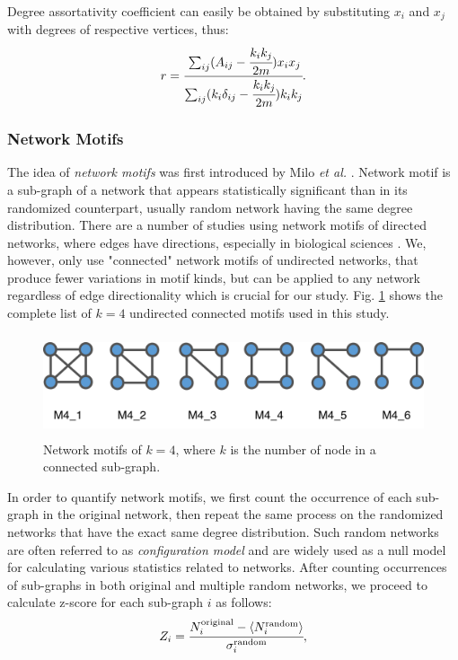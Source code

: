 \documentclass{article}
\begin{document}
Degree assortativity coefficient can easily be obtained by substituting $x_i$ and $x_j$ with degrees of respective vertices, thus:
	\begin{equation}
	 r =  \cfrac{\sum_{ij}(A_{ij} - \cfrac{k_i k_j}{2m})x_i x_j}{\sum_{ij}(k_i \delta_{ij} - \cfrac{k_i k_j}{2m}) k_i k_j}.
	\end{equation}

	\subsubsection{Network Motifs} 
The idea of \textit{network motifs} was first introduced by Milo \textit{et al.} \cite{Milo_motif}. Network motif is a sub-graph of a network that appears statistically significant than in its randomized counterpart, usually random network having the same degree distribution. There are a number of studies using network motifs of directed networks, where edges have directions, especially in biological sciences \cite{Alon2007, MotifsInBrain}. We, however, only use "connected" network motifs of undirected networks, that produce fewer variations in motif kinds, but can be applied to any network regardless of edge directionality which is crucial for our study. Fig. \ref{motifs} shows the complete list of $k=4$ undirected connected motifs used in this study.

\begin{figure}[ht]
	\begin{center}
		\vspace{0.5cm}
		\includegraphics[clip,width=12cm,height = 3cm]{motifs.png}
		\vspace{0.5cm}
		\caption{Network motifs of $k =4$, where $k$ is the number of node in a connected sub-graph.}
		\label{motifs}
	\end{center}
\end{figure}

In order to quantify network motifs, we first count the occurrence of each sub-graph in the original network, then repeat the same process on the randomized networks that have the exact same degree distribution. Such random networks are often referred to as \textit{configuration model} and are widely used as a null model for calculating various statistics related to networks. After counting occurrences of sub-graphs in both original and multiple random networks, we proceed to calculate z-score for each sub-graph $i$ as follows:
	\begin{equation}
	Z_i = \cfrac{N_i^{\text{original}} - \langle N_i^{\text{random}} \rangle }{\sigma_i^{\text{random}}},
	\end{equation}
\end{document}
